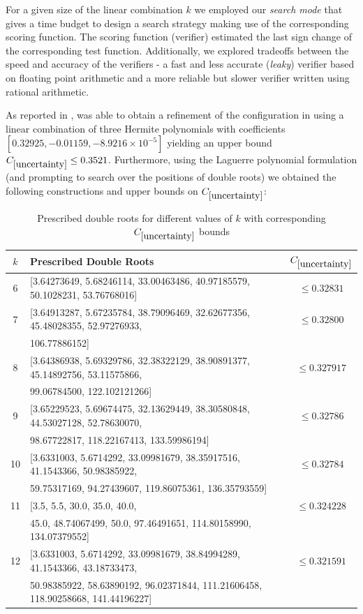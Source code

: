 For a given size of the linear combination $k$ we employed our \textit{search mode} that gives \AlphaEvolve a time budget to design a search strategy making use of the corresponding scoring function. The scoring function (verifier) estimated the last sign change of the corresponding test function. Additionally, 
we explored tradeoffs between the speed and accuracy of the verifiers - a fast and less accurate (\textit{leaky}) verifier based on floating point arithmetic and a more reliable but slower verifier written using rational arithmetic.

As reported in \cite{novikov2025alphaevolve}, \AlphaEvolve was able to obtain a refinement of the configuration in \cite{goncalves-etal} using a linear combination of three Hermite polynomials with coefficients $[0.32925, -0.01159, -8.9216 \times 10^{-5}
]$ yielding an upper bound $C_{\ref{uncertainty}} \leq 0.3521$. Furthermore, using the Laguerre polynomial formulation (and prompting \AlphaEvolve to search over the positions of double roots) we obtained the following constructions and upper bounds on $C_{\ref{uncertainty}}$:

\begin{table}[h]
\centering
\begin{tabular}{|c|l|c|}
\hline
$k$ & Prescribed Double Roots & $C_{\ref{uncertainty}}$ \\
\hline
6 & [3.64273649, 5.68246114, 33.00463486, 40.97185579, 50.1028231, 53.76768016] & $\leq 0.32831$ \\
\hline
7 & [3.64913287, 5.67235784, 38.79096469, 32.62677356, 45.48028355, 52.97276933, & $\leq 0.32800$ \\
  & 106.77886152] & \\
\hline
8 & [3.64386938, 5.69329786, 32.38322129, 38.90891377, 45.14892756, 53.11575866, 
 & $\leq 0.327917$ \\
  & 99.06784500, 122.102121266] & \\
\hline
9 & [3.65229523, 5.69674475, 32.13629449, 38.30580848, 44.53027128, 52.78630070,
 & $\leq 0.32786$ \\
  & 98.67722817, 118.22167413, 133.59986194] & \\
\hline
10 & [3.6331003, 5.6714292, 33.09981679, 38.35917516, 41.1543366, 50.98385922, 
 & $\leq 0.32784$ \\
  & 59.75317169, 94.27439607, 119.86075361, 136.35793559] & \\
\hline
11 & [3.5, 5.5, 30.0, 35.0, 40.0,
 & $\leq 0.324228$ \\
  & 45.0, 48.74067499, 50.0, 97.46491651, 114.80158990, 134.07379552] & \\
\hline
12 & [3.6331003, 5.6714292, 33.09981679, 38.84994289, 41.1543366, 43.18733473, 
 & $\leq 0.321591$ \\
  & 50.98385922, 58.63890192, 96.02371844, 111.21606458, 118.90258668, 141.44196227] & \\
\hline
\end{tabular}
\caption{Prescribed double roots for different values of $k$ with corresponding $C_{\ref{uncertainty}}$ bounds}
\label{tab:double_roots}
\end{table}

